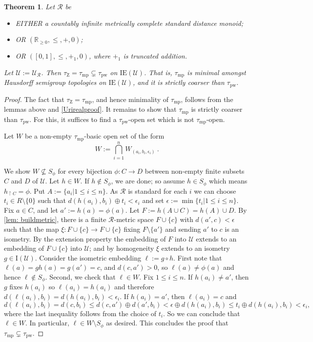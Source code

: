\documentclass{article}
\newtheorem{theorem}{Theorem}[section]
\theoremstyle{remark}
\theoremstyle{definition}
\newcommand{\U}[0]{\mathbb{U}}
\newcommand{\nn}[0]{S}%
\renewcommand{\U}[0]{\mathcal{U}}
\newcommand{\pw}[0]{\tau_{\mathrm{pw}}}
\newcommand{\zar}[0]{\tau_{\mathrm{Z}}}
\newcommand{\mpw}[0]{\tau_{\mathrm{mp}}}
\renewcommand\leq{\leqslant}
\renewcommand\geq{\geqslant}
\newcommand{\rr}[0]{\mathcal{R}}
\newcommand{\ie}[0]{\mathrm{IE}}
\begin{document}
{{{{{\begin{theorem}\label{thm:urysohnmain} Let $\rr$ be 
\begin{itemize}
    \item EITHER a countably infinite metrically complete standard distance monoid; 
    \item OR {$(\mathbb{R}_{\geq 0}, \leq, +, 0)$};
    \item OR $([0,1], \leq, +_1, 0)$, where $+_1$ is truncated addition.
\end{itemize}
Let $\U:=\U_{\rr}$. 
{Then $\zar=\mpw\subsetneq\pw$ on $\ie(\U)$.} 
That is, $\mpw$ is minimal amongst Hausdorff semigroup topologies on $\ie(\U)$, and it is strictly coarser than $\pw$.
\end{theorem}
\begin{proof} 
The fact that $\zar=\mpw$, and hence minimality of $\mpw$, follows from the lemmas above and \cref{Urirealproof}. 
It remains to show that $\mpw$ is strictly coarser than $\pw$. {
For this, it suffices to find a 
$\pw$-open set which is not $\mpw$-open.}

Let $W$ be a non-empty $\mpw$-basic open set of the form
\[W:=\bigcap_{i=1}^n W_{(a_i, b_i, \epsilon_i)}\:.\]

{We show $W\nsubseteq\nn_\phi$  for every bijection $\phi:C\to D$ between non-empty finite subsets $C$ and $D$ of $\U$. Let $h\in W$. If $h\not\in \nn_\phi$, we are done; so assume $h\in \nn_\phi$ which means $h_{\upharpoonright C}=\phi$.
Put $A:=\{a_i\vert 1\leq i\leq n\}$. As $\rr$ is standard for each $i$ we can choose $t_i\in R\setminus \{0\}$ such that $d(h(a_i),b_i)\oplus t_i<\epsilon_i$ and set $\epsilon:=\min\{t_i\vert 1\leq i\leq n\}$.
Fix $a\in C$, and let $a':=h(a)=\phi(a)$. Let $F:=h(A\cup C)=h(A)\cup D$. By \cref{lem: buildmetric}, there is a finite $\rr$-metric space $F\cup\{c\}$ with $d(a', c)<\epsilon$ such that the map $\xi:F\cup\{c\}\to F\cup \{c\}$ fixing $F\setminus\{a'\}$ and sending $a'$ to $c$ is an isometry. By the extension property the embedding of $F$ into $\U$ extends to an embedding of $F\cup\{c\}$ into $\U$; and by homogeneity $\xi$ extends to an isometry $g\in\mathrm{I}(\U)$.
Consider the isometric embedding $\ell:=g\circ h$. First note that $\ell(a)=g h(a)=g(a')=c$, and $d(c, a')>0$, so $\ell(a)\neq \phi(a)$ and hence $\ell\not\in\nn_\phi$. Second, we check that $\ell\in W$. Fix $1\leq i\leq n$. If $h(a_i)\neq a'$, then $g$ fixes $h(a_i)$ so $\ell(a_i)=h(a_i)$ and therefore $d(\ell(a_i),b_i)=d(h(a_i),b_i)<\epsilon_i$. If $h(a_i)=a'$, then $\ell(a_i)=c$ and
\[d(\ell(a_i),b_i)=d(c,b_i)\leq d(c,a')\oplus d(a',b_i)<\epsilon\oplus d(h(a_i),b_i)\leq t_i\oplus d(h(a_i),b_i)<\epsilon_i,\]
where the last inequality follows from the choice of $t_i$.
So we can conclude that $\ell\in W$. In particular, $\ell \in W\setminus \nn_\phi$ as desired. This concludes the proof that $\mpw\subsetneq\pw$.}
\end{proof}

}}}}}
\end{document}
